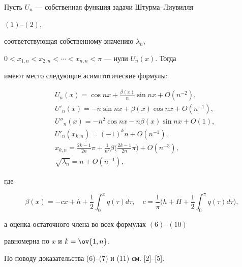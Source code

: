 \begin{lem} 


Пусть $U_n$ --- собственная функция задачи Штурма--Лиувилля 


$(1)$--$(2)$, 


соответствующая собственному значению $\lambda_n$, 


$0<x_{1,n}<x_{2,n}<\dotsb<x_{n,n}<\pi$ --- нули $U_n(x)$. Тогда 


имеют место следующие асимптотические формулы\/$:$


\begin{align} 


& U_n(x)=\cos nx+\frac{\beta(x)}{n} 


\sin nx+O(n^{-2}),\\ 


% 


& U'_n(x)=-n\sin nx+\beta(x)\cos nx+O(n^{-1}), \\ 


% 


& U''_n(x)=-n^2\cos nx-n\beta(x)\sin nx+O(1), \\ 


% 


& U'_n(x_{k,n})=(-1)^k n +O(n^{-1}), \\ 


% 


&x_{k,n}=\frac{2k-1}{2n}\pi+\frac{1}{n^2}\beta 


\bigg(\frac{2k-1}{2n}\pi \bigg)+O(n^{-3}), \\ 


% 


& \sqrt{\lambda_n}=n+O(n^{-1}), 


\end{align} 


где 


$$ 


\beta(x)=-cx+h+\frac{1}{2}\int^x_0 q(\tau)d\tau,\quad 


c=\frac{1}{\pi}\bigg(h+H+\frac{1}{2}\int^\pi_0 q(\tau)d\tau


\bigg),


$$ 


а оценка остаточного члена во всех формулах $(6)$--$(10)$ 


равномерна по $x$ и $k=\ov{1,n}$. 


\end{lem} 


 


По поводу доказательства (6)--(7) и (11) см. [2]--[5]. 


